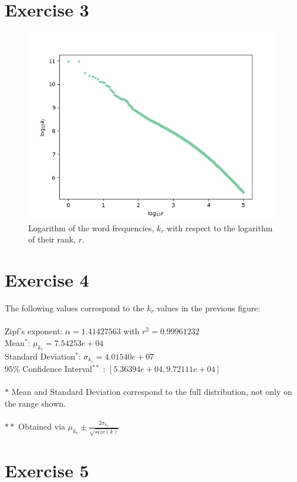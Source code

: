 \documentclass{article}
\begin{document}
\section{Exercise 3} 

\begin{figure}[h!]
\includegraphics[width=\linewidth]{Q03/zipfRanksLog.jpg}
\caption{Logarithm of the word frequencies, $k_r$ with respect to the logarithm of their rank, $r$. }
\label{fig:zipf}
\end{figure}

\section{Exercise 4}

The following values correspond to the $k_r$ values in the previous figure: \\
\\
Zipf's exponent: $\alpha = 1.41427563$ with $r^2 = 0.99961232$\\
Mean$^*$: $\mu_{k_r} = 7.54253e+04$\\
Standard Deviation$^*$: $\sigma_{k_r} = 4.01540e+07$\\
$95\%$ Confidence Interval$^{**}$ : $[5.36394e+04,9.72111e+04]$\\
\\
$*$ Mean and Standard Deviation correspond to the full distribution, not only on the range shown.\\
\\
$**$ Obtained via $\mu_{k_r} \pm \frac{2\sigma_{k_r}}{\sqrt{size(k)}}$ 

\section{Exercise 5} 
\end{document}
